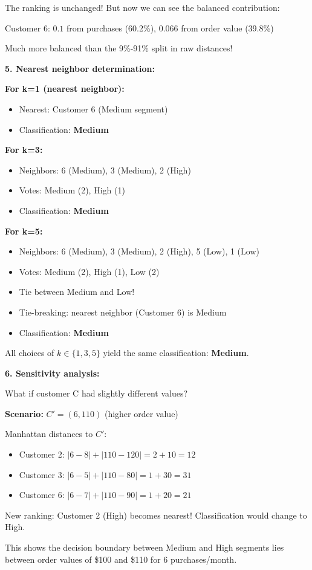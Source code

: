 \documentclass[12pt]{article}
\begin{document}
\begin{computation}
The ranking is unchanged! But now we can see the balanced contribution:

Customer 6: \(0.1\) from purchases (60.2\%), \(0.066\) from order value (39.8\%)

Much more balanced than the 9\%-91\% split in raw distances!

\textbf{5. Nearest neighbor determination:}

\textbf{For k=1 (nearest neighbor):}
\begin{itemize}
    \item Nearest: Customer 6 (Medium segment)
    \item Classification: \textbf{Medium}
\end{itemize}

\textbf{For k=3:}
\begin{itemize}
    \item Neighbors: 6 (Medium), 3 (Medium), 2 (High)
    \item Votes: Medium (2), High (1)
    \item Classification: \textbf{Medium}
\end{itemize}

\textbf{For k=5:}
\begin{itemize}
    \item Neighbors: 6 (Medium), 3 (Medium), 2 (High), 5 (Low), 1 (Low)
    \item Votes: Medium (2), High (1), Low (2)
    \item Tie between Medium and Low!
    \item Tie-breaking: nearest neighbor (Customer 6) is Medium
    \item Classification: \textbf{Medium}
\end{itemize}

All choices of \(k \in \{1,3,5\}\) yield the same classification: \textbf{Medium}.

\textbf{6. Sensitivity analysis:}

What if customer C had slightly different values?

\textbf{Scenario: } \(C' = (6, 110)\) (higher order value)

Manhattan distances to \(C'\):
\begin{itemize}
    \item Customer 2: \(|6-8| + |110-120| = 2 + 10 = 12\)
    \item Customer 3: \(|6-5| + |110-80| = 1 + 30 = 31\)
    \item Customer 6: \(|6-7| + |110-90| = 1 + 20 = 21\)
\end{itemize}

New ranking: Customer 2 (High) becomes nearest! Classification would change to High.

This shows the decision boundary between Medium and High segments lies between order values of \$100 and \$110 for 6 purchases/month.
\end{computation}
\end{document}
